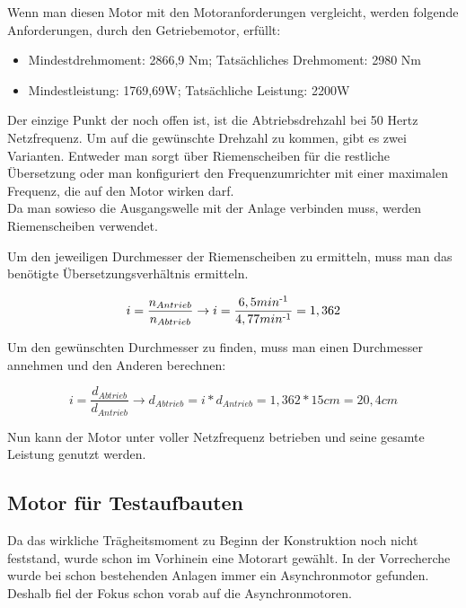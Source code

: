 Wenn man diesen Motor mit den Motoranforderungen vergleicht, werden folgende Anforderungen, durch den Getriebemotor, erfüllt:

\begin{itemize}
	\item{Mindestdrehmoment: 2866,9 Nm; Tatsächliches Drehmoment: 2980 Nm}
	\item{Mindestleistung: 1769,69W; Tatsächliche Leistung: 2200W}
\end{itemize}

Der einzige Punkt der noch offen ist, ist die Abtriebsdrehzahl bei 50 Hertz Netzfrequenz. Um auf die gewünschte Drehzahl zu kommen, gibt es zwei Varianten. Entweder man sorgt über Riemenscheiben für die restliche Übersetzung oder man konfiguriert den Frequenzumrichter mit einer maximalen Frequenz, die auf den Motor wirken darf. \\

Da man sowieso die Ausgangswelle mit der Anlage verbinden muss, werden Riemenscheiben verwendet.

Um den jeweiligen Durchmesser der Riemenscheiben zu ermitteln, muss man das benötigte Übersetzungsverhältnis ermitteln.

\begin{center}
\begin{equation}
  \label{eq:5}
	i=  \frac{n_{Antrieb}}{n_{Abtrieb}} \rightarrow i = \frac{6,5 min\textsuperscript{-1}}{4,77 min\textsuperscript{-1}} = 1,362
\end{equation} 
\end{center}

Um den gewünschten Durchmesser zu finden, muss man einen Durchmesser annehmen und den Anderen berechnen:

\begin{center}
\begin{equation}
  \label{eq:6}
	i=  \frac{d_{Abtrieb}}{d_{Antrieb}} \rightarrow d_{Abtrieb} = i * d_{Antrieb} =  1,362 * 15 cm = 20,4cm
\end{equation} 
\end{center}

Nun kann der Motor unter voller Netzfrequenz betrieben und seine gesamte Leistung genutzt werden. 

\subsection{Motor für Testaufbauten}
\label{sec:motorFuerTestaufbauten}

Da das wirkliche Trägheitsmoment zu Beginn der Konstruktion noch nicht feststand, wurde schon im Vorhinein eine Motorart gewählt. In der Vorrecherche wurde bei schon bestehenden Anlagen immer ein Asynchronmotor gefunden. Deshalb fiel der Fokus schon vorab auf die Asynchronmotoren.
\newpage
